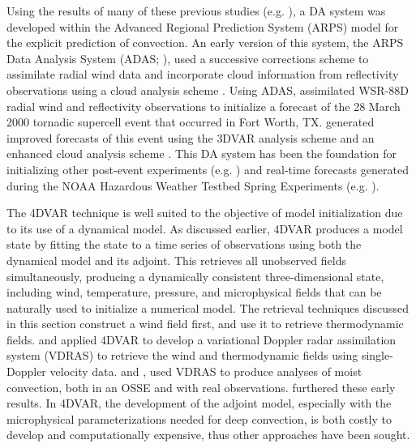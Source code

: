 Using the results of many of these previous studies (e.g. \citealt{shapiroetal95,gaoetal01}), a DA system was developed within the Advanced Regional Prediction System (ARPS) model \citep{xueetal95,xueetal00,xueetal01} for the explicit prediction of convection. An early version of this system, the ARPS Data Analysis System (ADAS; \citealt{brewster96}), used a successive corrections scheme \citet{bratseth86} to assimilate radial wind data and incorporate cloud information from reflectivity observations using a cloud analysis scheme \citep{albertsetal96,zhangetal98}. Using ADAS, \citet{xueetal03} assimilated WSR-88D radial wind and reflectivity observations to initialize a forecast of the 28 March 2000 tornadic supercell event that occurred in Fort Worth, TX. \citet{huetal05,huetal06} generated improved forecasts of this event using the \citealt{gaoetal04} 3DVAR analysis scheme and an enhanced cloud analysis scheme \citep{gaoetal02}. This DA system has been the foundation for initializing other post-event experiments (e.g. \citealt{huetal07}) and real-time forecasts generated during the NOAA Hazardous Weather Testbed Spring Experiments (e.g. \citealt{xueetal08}).

The 4DVAR technique is well suited to the objective of model initialization due to its use of a dynamical model. As discussed earlier, 4DVAR produces a model state by fitting the state to a time series of observations using both the dynamical model and its adjoint. This retrieves all unobserved fields simultaneously, producing a dynamically consistent three-dimensional state, including wind, temperature, pressure, and microphysical fields that can be naturally used to initialize a numerical model. The retrieval techniques discussed in this section construct a wind field first, and use it to retrieve thermodynamic fields. \citet{sunetal91} and \citet{suncrook94} applied 4DVAR to develop a variational Doppler radar assimilation system (VDRAS) to retrieve the wind and thermodynamic fields using single-Doppler velocity data. \citet{suncrook97} and \citet{suncrook98}, used VDRAS to produce analyses of moist convection, both in an OSSE and with real observations. \citet{wuetal00} furthered these early results. In 4DVAR, the development of the adjoint model, especially with the microphysical parameterizations needed for deep convection, is both costly to develop and computationally expensive, thus other approaches have been sought.


